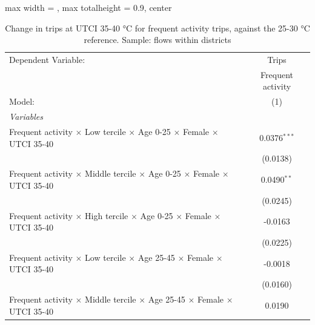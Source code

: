 
\begin{table}[htbp]
   \caption{\label{table_intersectionality_frequent_activity_35-40} Change in trips at UTCI 35-40 °C for frequent activity trips, against the 25-30 °C reference. Sample: flows within districts}
   \centering
   \small
   \begin{adjustbox}{max width = \textwidth, max totalheight = 0.9\textheight, center}
      \begin{tabular}{lc}
         \tabularnewline \midrule \midrule
         Dependent Variable:                                                                                   & Trips\\  
                                                                                                               & Frequent activity \\   
         Model:                                                                                                & (1)\\  
         \midrule
         \emph{Variables}\\
         Frequent activity $\times$ Low tercile $\times$ Age 0-25 $\times$ Female $\times$ UTCI 35-40          & 0.0376$^{***}$\\   
                                                                                                               & (0.0138)\\   
         Frequent activity $\times$ Middle tercile $\times$ Age 0-25 $\times$ Female $\times$ UTCI 35-40       & 0.0490$^{**}$\\   
                                                                                                               & (0.0245)\\   
         Frequent activity $\times$ High tercile $\times$ Age 0-25 $\times$ Female $\times$ UTCI 35-40         & -0.0163\\   
                                                                                                               & (0.0225)\\   
         Frequent activity $\times$ Low tercile $\times$ Age 25-45 $\times$ Female $\times$ UTCI 35-40         & -0.0018\\   
                                                                                                               & (0.0160)\\   
         Frequent activity $\times$ Middle tercile $\times$ Age 25-45 $\times$ Female $\times$ UTCI 35-40      & 0.0190\\   

\end{tabular}
\end{adjustbox}
\end{table}
